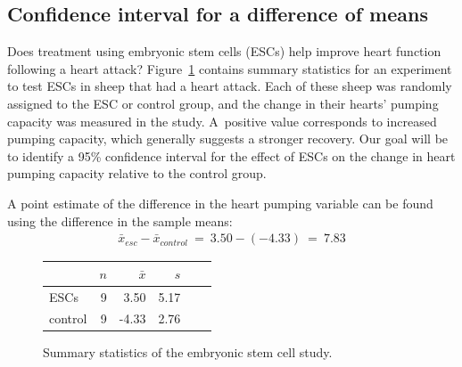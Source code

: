 \subsection{Confidence interval for a difference of means}


Does treatment using embryonic stem cells (ESCs) help improve heart function following a heart attack?
Figure~\ref{summaryStatsForSheepHeartDataWhoReceivedMiceESCs} contains summary statistics for an experiment to test ESCs in sheep that had a heart attack. Each of these sheep was randomly assigned to the ESC or control group, and the change in their hearts' pumping capacity was measured in the study. A~positive value corresponds to increased pumping capacity, which generally suggests a stronger recovery. Our goal will be to identify a 95\% confidence interval for the effect of ESCs on the change in heart pumping capacity relative to the control group.

A point estimate of the difference in the heart pumping variable can be found using the difference in the sample means:
\begin{align*}
\bar{x}_{esc} - \bar{x}_{control}\ =\ 3.50 - (-4.33)\ =\ 7.83
\end{align*}

\begin{figure}[h]
\centering
\begin{tabular}{l rrrrr}
\hline
\hspace{10mm}	& $n$	& $\bar{x}$	& $s$  	 \\
\hline
ESCs		& 9		& 3.50		& 5.17  	\\
control		& 9		& -4.33		& 2.76  	 \\
\hline
\end{tabular}
\caption{Summary statistics of the embryonic stem cell study.}
\label{summaryStatsForSheepHeartDataWhoReceivedMiceESCs}
\end{figure}


